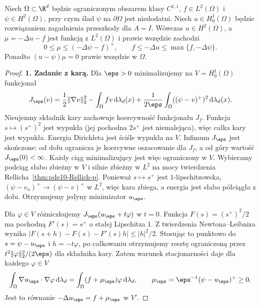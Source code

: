 \begin{twierdzenie}
\label{thm:pde29-LS}
Niech $\Omega\subset\R^d$ będzie ograniczonym obszarem
klasy $C^{1,1}$, $f\in L^2(\Omega)$ i
$\psi\in H^2(\Omega)$, przy czym ślad $\psi$ na
$\partial\Omega$ jest niedodatni. Niech $u\in H_0^1(\Omega)$
będzie rozwiązaniem zagadnienia przeszkody dla $A=I$.
Wówczas $u\in H^2(\Omega)$, a $\mu=-\Delta u-f$ jest funkcją
z $L^2(\Omega)$ i prawie wszędzie zachodzi
\begin{equation}\label{eq:pde29-LS}
 0\le\mu\le(-\Delta\psi-f)^+,
 \qquad f\le-\Delta u\le\max\{f,-\Delta\psi\}.
\end{equation}
Ponadto $(u-\psi)\mu=0$ prawie wszędzie w $\Omega$.
\end{twierdzenie}
\begin{proof}
\textbf{1. Zadanie z karą.}
Dla $\eps>0$ minimalizujemy na $V=H_0^1(\Omega)$
funkcjonał
\[
 J_\eps(v)=\frac12\|\nabla v\|_2^2
 -\int_\Omega fv\,\mathrm d\lambda_d(x)
 +\frac1{2\eps}\int_\Omega((\psi-v)^+)^2\,\mathrm d\lambda_d(x).
\]
Nieujemny składnik kary zachowuje koercywność
funkcjonału $J_f$. Funkcja $s\mapsto(s^+)^2$
jest wypukła (jej pochodna $2s^+$ jest niemalejąca),
więc całka kary jest wypukła. Energia Dirichleta
jest ściśle wypukła na $V$.
Infimum $J_\eps$ jest skończone: od dołu
ogranicza je koercywne oszacowanie dla $J_f$,
a od góry wartość $J_\eps(0)<\infty$.
Każdy ciąg minimalizujący jest więc ograniczony
w $V$. Wybieramy podciąg słabo zbieżny w $V$
i silnie zbieżny w $L^2$
na mocy twierdzenia Rellicha~\ref{thm:pde10-Rellich-p}.
Ponieważ $s\mapsto s^+$ jest $1$-lipschitzowska,
$(\psi-v_n)^+\to(\psi-v)^+$ w $L^2$, więc kara
zbiega, a energia jest słabo półciągła z dołu.
Otrzymujemy jedyny minimizator $u_\eps$.

Dla $\varphi\in V$ różniczkujemy
$J_\eps(u_\eps+t\varphi)$ w $t=0$.
Funkcja $F(s)=(s^+)^2/2$ ma pochodną $F'(s)=s^+$
o stałej Lipschitza $1$. Z twierdzenia Newtona--Leibniza
wynika $|F(s+h)-F(s)-F'(s)h|\le |h|^2/2$.
Stosując to punktowo do $s=\psi-u_\eps$ i $h=-t\varphi$,
po całkowaniu otrzymujemy resztę ograniczoną przez
$t^2\|\varphi\|_2^2/(2\eps)$ dla składnika kary.
Zatem warunek stacjonarności daje dla każdego $\varphi\in V$
\[
 \int_\Omega\nabla u_\eps\cdot\nabla\varphi\,
 \mathrm d\lambda_d=\int_\Omega(f+\mu_\eps)\varphi\,
 \mathrm d\lambda_d,\qquad
 \mu_\eps=\eps^{-1}(\psi-u_\eps)^+\ge0.
\]
Jest to równanie $-\Delta u_\eps=f+\mu_\eps$ w $V'$.


\end{proof}
